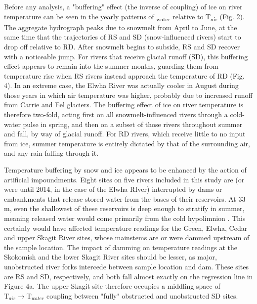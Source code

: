 \documentclass[notitlepage]{article}
\begin{document}
Before any analysis, a "buffering" effect (the inverse of coupling) of ice on river temperature can be seen in the yearly patterns of \textsubscript{water} relative to T\textsubscript{air} (Fig. 2). The aggregate hydrograph peaks due to snowmelt from April to June, at the same time that the trajectories of RS and SD (snow-influenced rivers) start to drop off relative to RD. After snowmelt begins to subside, RS and SD recover with a noticeable jump. For rivers that receive glacial runoff (SD), this buffering effect appears to remain into the summer months, guarding them from temperature rise when RS rivers instead approach the temperature of RD (Fig. 4). In an extreme case, the Elwha River was actually cooler in August during those years in which air temperature was higher, probably due to increased runoff from Carrie and Eel glaciers. The buffering effect of ice on river temperature is therefore two-fold, acting first on all snowmelt-influenced rivers through a cold-water pulse in spring, and then on a subset of those rivers throughout summer and fall, by way of glacial runoff. For RD rivers, which receive little to no input from ice, summer temperature is entirely dictated by that of the surrounding air, and any rain falling through it.

Temperature buffering by snow and ice appears to be enhanced by the action of artificial impoundments. Eight sites on five rivers included in this study are (or were until 2014, in the case of the Elwha RIver) interrupted by dams or embankments that release stored water from the bases of their reservoirs. At 33 m, even the shallowest of these reservoirs is deep enough to stratify in summer, meaning released water would come primarily from the cold hypolimnion \citep{olden_hypoCold}. This certainly would have affected temperature readings for the Green, Elwha, Cedar and upper Skagit River sites, whose mainstems are or were dammed upstream of the sample location. The impact of damming on temperature readings at the Skokomish and the lower Skagit River sites should be lesser, as major, unobstructed river forks intercede between sample location and dam. These sites are RS and SD, respectively, and both fall almost exactly on the regression line in Figure 4a. The upper Skagit site therefore occupies a middling space of $\textrm{T}_{air}\rightarrow \textrm{T}_{water}$ coupling between "fully" obstructed and unobstructed SD sites.
\end{document}
